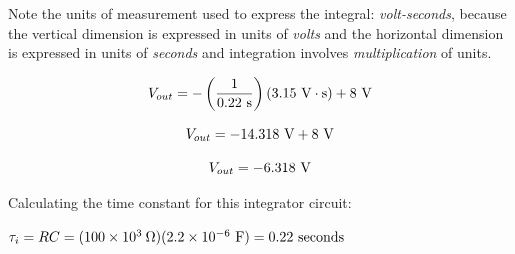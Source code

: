 Note the units of measurement used to express the integral: {\it volt-seconds}, because the vertical dimension is expressed in units of {\it volts} and the horizontal dimension is expressed in units of {\it seconds} and integration involves {\it multiplication} of units.

$$V_{out} = - \left( {1 \over 0.22 \hbox{ s}} \right) (3.15 \hbox{ V} \cdot \hbox{s}) + 8 \hbox{ V}$$

$$V_{out} = - 14.318 \hbox{ V} + 8 \hbox{ V}$$

$$V_{out} = - 6.318 \hbox{ V}$$

\vskip 10pt

Calculating the time constant for this integrator circuit:

\vskip 10pt

$\tau_i = RC = (100 \times 10^3 \> \Omega)(2.2 \times 10^{-6} \hbox{ F}) = 0.22 \hbox{ seconds}$











